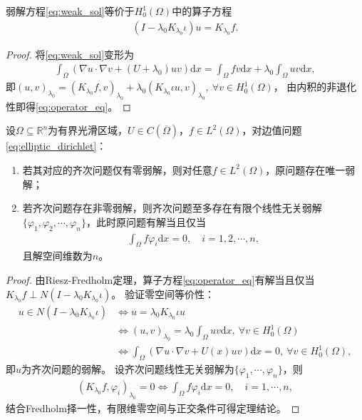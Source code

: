 \documentclass[../../main.tex]{subfiles}%
\begin{document}
\begin{proposition}
弱解方程\eqref{eq:weak_sol}等价于$H_0^1(\Omega)$中的算子方程
\begin{align}
\left(I-\lambda_0 K_{\lambda_0}\iota\right)u=K_{\lambda_0}f.
\label{eq:operator_eq}
\end{align}
\end{proposition}
\begin{proof}

将\eqref{eq:weak_sol}变形为
\begin{align*}
\int_{\Omega}\left(\nabla u\cdot\nabla v+\left(U+\lambda_0\right)uv\right)\mathrm{d}x=\int_{\Omega}fv\mathrm{d}x+\lambda_0\int_{\Omega}uv\mathrm{d}x,
\end{align*}
即$(u,v)_{\lambda_0}=(K_{\lambda_0}f,v)_{\lambda_0}+\lambda_0(K_{\lambda_0}\iota u,v)_{\lambda_0},\ \forall v\in H_0^1(\Omega)$，
由内积的非退化性即得\eqref{eq:operator_eq}。

\end{proof}

\begin{theorem}
设$\Omega\subseteq\mathbb{R}^n$为有界光滑区域，$U\in C(\overline{\Omega})$，$f\in L^2(\Omega)$，对边值问题\eqref{eq:elliptic_dirichlet}：
\begin{enumerate}[(1)]
\item 若其对应的齐次问题仅有零弱解，则对任意$f\in L^2(\Omega)$，原问题存在唯一弱解；
\item 若齐次问题存在非零弱解，则齐次问题至多存在有限个线性无关弱解$\{\varphi_1,\varphi_2,\cdots,\varphi_n\}$，此时原问题有解当且仅当
\begin{align*}
\int_{\Omega}f\varphi_i\mathrm{d}x=0,\quad i=1,2,\cdots,n,
\end{align*}
且解空间维数为$n$。
\end{enumerate}
\end{theorem}
\begin{proof}

由Riesz-Fredholm定理，算子方程\eqref{eq:operator_eq}有解当且仅当$K_{\lambda_0}f\perp N\left(I-\lambda_0 K_{\lambda_0}\iota\right)$。
验证零空间等价性：
\begin{align*}
u\in N\left(I-\lambda_0 K_{\lambda_0}\iota\right)&\iff u=\lambda_0 K_{\lambda_0}\iota u\\
&\iff (u,v)_{\lambda_0}=\lambda_0\int_{\Omega}uv\mathrm{d}x,\ \forall v\in H_0^1(\Omega)\\
&\iff \int_{\Omega}\left(\nabla u\cdot\nabla v+U(x)uv\right)\mathrm{d}x=0,\ \forall v\in H_0^1(\Omega),
\end{align*}
即$u$为齐次问题的弱解。
设齐次问题线性无关弱解为$\{\varphi_1,\cdots,\varphi_n\}$，则
\begin{align*}
(K_{\lambda_0}f,\varphi_i)_{\lambda_0}=0\iff\int_{\Omega}f\varphi_i\mathrm{d}x=0,\quad i=1,\cdots,n,
\end{align*}
结合Fredholm择一性，有限维零空间与正交条件可得定理结论。

\end{proof}
\end{document}

